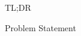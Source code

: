 \documentclass[final,11pt]{beamer}
\newlength{\colwidth}
\newcommand{\E}{\mathbb{E}}    %
\newcommand{\R}{\mathbb{R}}    %
\renewcommand{\mid}{\,|\,}
\DeclareMathOperator{\R}{\mathbb{R}}
\DeclareMathOperator{\E}{\mathbb{E}}
\newcommand{\modeInd}{\ensuremath{k}}
\newcommand{\StateDim}{\ensuremath{{D_x}}}
\newcommand{\ControlDim}{\ensuremath{{D_u}}}
\newcommand{\ModeInd}{\ensuremath{\MakeUppercase{\modeInd}}}
\newcommand{\mode}[1]{\ensuremath{#1_{\modeInd}}}
\newcommand{\state}{\ensuremath{\mathbf{x}}}
\newcommand{\control}{\ensuremath{\mathbf{u}}}
\newcommand{\modeVar}{\ensuremath{\alpha}}
\newcommand{\timeInd}{\ensuremath{t}}
\newcommand{\TimeInd}{\ensuremath{\MakeUppercase{\timeInd}}}
\newcommand{\dynamicsFunc}{\ensuremath{f}}
\newcommand{\policy}{\ensuremath{\pi}}
\newcommand{\desiredMode}{\ensuremath{\modeInd^{*}}}
\newcommand{\stateDomain}{\ensuremath{\mathcal{S}}}
\newcommand{\controlDomain}{\ensuremath{\mathcal{A}}}
\renewcommand{\state}{\ensuremath{\mathbf{s}}}
\renewcommand{\mode}[1]{\ensuremath{#1_{\modeInd}}}
\renewcommand{\control}{\ensuremath{\mathbf{a}}}
\newcommand{\rewardFunc}{\ensuremath{r}}
\begin{document}
\begin{frame}[t]
\begin{columns}[t]
\begin{column}{\colwidth}
\begin{alertblock}{TL;DR}
  \end{alertblock}

  \begin{block}{Problem Statement}





\end{block}
\end{column}
\end{columns}
\end{frame}
\end{document}

